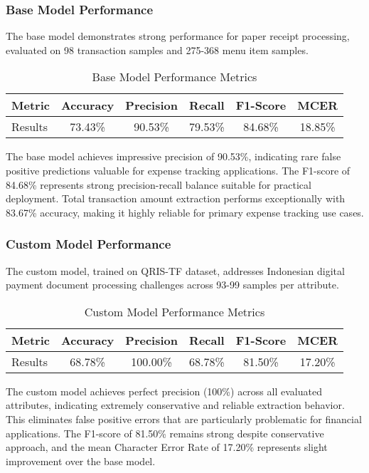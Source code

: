 \subsubsection{Base Model Performance}
The base model demonstrates strong performance for paper receipt processing, evaluated on 98 transaction samples and 275-368 menu item samples.

\begin{table}[htbp]
\centering
\caption{Base Model Performance Metrics}
\label{tab:base-model}
\begin{tabular}{|l|c|c|c|c|c|}
\hline
\textbf{Metric} & \textbf{Accuracy} & \textbf{Precision} & \textbf{Recall} & \textbf{F1-Score} & \textbf{MCER} \\
\hline
Results & 73.43\% & 90.53\% & 79.53\% & 84.68\% & 18.85\% \\
\hline
\end{tabular}
\end{table}

The base model achieves impressive precision of 90.53\%, indicating rare false positive predictions valuable for expense tracking applications. The F1-score of 84.68\% represents strong precision-recall balance suitable for practical deployment. Total transaction amount extraction performs exceptionally with 83.67\% accuracy, making it highly reliable for primary expense tracking use cases.

\subsubsection{Custom Model Performance}
The custom model, trained on QRIS-TF dataset, addresses Indonesian digital payment document processing challenges across 93-99 samples per attribute.

\begin{table}[htbp]
\centering
\caption{Custom Model Performance Metrics}
\label{tab:custom-model}
\begin{tabular}{|l|c|c|c|c|c|}
\hline
\textbf{Metric} & \textbf{Accuracy} & \textbf{Precision} & \textbf{Recall} & \textbf{F1-Score} & \textbf{MCER} \\
\hline
Results & 68.78\% & 100.00\% & 68.78\% & 81.50\% & 17.20\% \\
\hline
\end{tabular}
\end{table}

The custom model achieves perfect precision (100\%) across all evaluated attributes, indicating extremely conservative and reliable extraction behavior. This eliminates false positive errors that are particularly problematic for financial applications. The F1-score of 81.50\% remains strong despite conservative approach, and the mean Character Error Rate of 17.20\% represents slight improvement over the base model.

